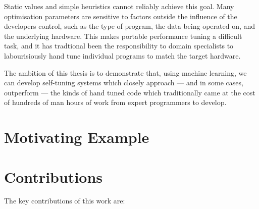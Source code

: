 Static values and simple heuristics cannot reliably achieve this
goal. Many optimisation parameters are sensitive to factors outside
the influence of the developers control, such as the type of program,
the data being operated on, and the underlying hardware. This makes
portable performance tuning a difficult task, and it has tradtional
been the responsibility to domain specialists to labourisiously hand
tune individual programs to match the target hardware.

The ambition of this thesis is to demonstrate that, using machine
learning, we can develop self-tuning systems which closely approach
--- and in some cases, outperform --- the kinds of hand tuned code
which traditionally came at the cost of hundreds of man hours of work
from expert programmers to develop.


\section{Motivating Example}




\section{Contributions}

The key contributions of this work are:

